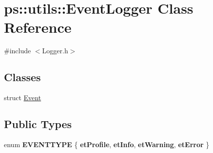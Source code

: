 \hypertarget{classps_1_1utils_1_1EventLogger}{}\section{ps\+:\+:utils\+:\+:Event\+Logger Class Reference}
\label{classps_1_1utils_1_1EventLogger}


{\ttfamily \#include $<$Logger.\+h$>$}

\subsection*{Classes}
\begin{DoxyCompactItemize}
\item 
struct \hyperlink{structps_1_1utils_1_1EventLogger_1_1Event}{Event}
\end{DoxyCompactItemize}
\subsection*{Public Types}
\begin{DoxyCompactItemize}
\item 
\hypertarget{classps_1_1utils_1_1EventLogger_a2ec7ed52f7fe7780454cfa214ecdc575}{}enum {\bfseries E\+V\+E\+N\+T\+T\+Y\+P\+E} \{ {\bfseries et\+Profile}, 
{\bfseries et\+Info}, 
{\bfseries et\+Warning}, 
{\bfseries et\+Error}
 \}\label{classps_1_1utils_1_1EventLogger_a2ec7ed52f7fe7780454cfa214ecdc575}

\end{DoxyCompactItemize}
